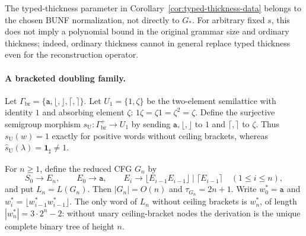 \documentclass[11pt,a4paper]{article}
\theoremstyle{remark}
\theoremstyle{plain}
\begin{document}
The typed-thickness parameter in Corollary~\ref{cor:typed-thickness-data}
belongs to the chosen BUNF normalization, not directly to $G_*$.
For arbitrary fixed $s$, this does not imply a polynomial bound
in the original grammar size and ordinary thickness; indeed,
ordinary thickness cannot in general replace typed thickness
even for the reconstruction operator.

\paragraph{A bracketed doubling family.}
Let $\Gamma_{\mathrm{br}}=\{\mathtt a,\lfloor,\rfloor,\lceil,\rceil\}$.
Let $U_1=\{1,\zeta\}$ be the two-element semilattice
with identity $1$ and absorbing element $\zeta$:
$1\zeta=\zeta1=\zeta^2=\zeta$.
Define the surjective semigroup morphism
$s_{\mathrm U}:\Gamma_{\mathrm{br}}^+\to U_1$ by sending
$\mathtt a,\lfloor,\rfloor$ to $1$ and
$\lceil,\rceil$ to $\zeta$.
Thus $s_{\mathrm U}(w)=1$ exactly for positive
words without ceiling brackets, whereas
$\widehat{s}_{\mathrm U}(\lambda)=\mathbf{1}_{\sharp}\ne1$.

For $n\ge1$, define the reduced CFG $G_n$ by
\[
 S_0\to E_n,\qquad E_0\to\mathtt a,\qquad
 E_i\to\lfloor{}E_{i-1}E_{i-1}\rfloor
       \mid\lceil{}E_{i-1}\rceil
 \quad(1\le i\le n),
\]
and put $L_n=L(G_n)$. Then $|G_n|=O(n)$ and
$\tau_{G_n}=2n+1$.
Write $w^*_0=\mathtt a$ and
$w^*_i=\lfloor{}w^*_{i-1}w^*_{i-1}\rfloor$.
The only word of $L_n$ without ceiling brackets is $w^*_n$, of length
$|w^*_n|=3\cdot2^n-2$: without unary ceiling-bracket nodes the
derivation is the unique complete binary tree of height $n$.
\end{document}
